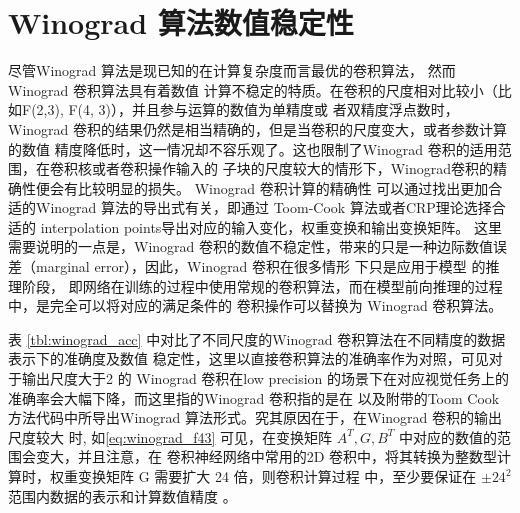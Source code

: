 \section{Winograd 算法数值稳定性}

尽管Winograd 算法是现已知的在计算复杂度而言最优的卷积算法， 然而 Winograd 卷积算法具有着数值
计算不稳定的特质。在卷积的尺度相对比较小（比如F(2,3), F(4, 3)），并且参与运算的数值为单精度或
者双精度浮点数时，Winograd 卷积的结果仍然是相当精确的，但是当卷积的尺度变大，或者参数计算的数值
精度降低时，这一情况却不容乐观了。这也限制了Winograd 卷积的适用范围，在卷积核或者卷积操作输入的
子块的尺度较大的情形下，Winograd卷积的精确性便会有比较明显的损失。 Winograd 卷积计算的精确性
可以通过找出更加合适的Winograd 算法的导出式有关，即通过 Toom-Cook 算法或者CRP理论选择合适的
interpolation points导出对应的输入变化，权重变换和输出变换矩阵。 这里需要说明的一点是，Winograd 
卷积的数值不稳定性，带来的只是一种边际数值误差（marginal error），因此，Winograd 卷积在很多情形
下只是应用于模型 的推理阶段，
即网络在训练的过程中使用常规的卷积算法，而在模型前向推理的过程中，是完全可以将对应的满足条件的
卷积操作可以替换为 Winograd 卷积算法。

表 \ref{tbl:winograd_acc} 中对比了不同尺度的Winograd 卷积算法在不同精度的数据表示下的准确度及数值
稳定性，这里以直接卷积算法的准确率作为对照，可见对于输出尺度大于2 的 Winograd 卷积在low precision 
的场景下在对应视觉任务上的准确率会大幅下降，而这里指的Winograd 卷积指的是在 \cite{Lavin2015FastAF}
以及附带的Toom Cook 方法代码中所导出Winograd 算法形式。究其原因在于，在Winograd 卷积的输出尺度较大
时, 如\ref{eq:winograd_f43} 可见，在变换矩阵 $A^T, G, B^T$ 中对应的数值的范围会变大，并且注意，在
卷积神经网络中常用的2D 卷积中，将其转换为整数型计算时，权重变换矩阵 G 需要扩大 24 倍，则卷积计算过程
中，至少要保证在 $\pm24^2$ 范围内数据的表示和计算数值精度 。

